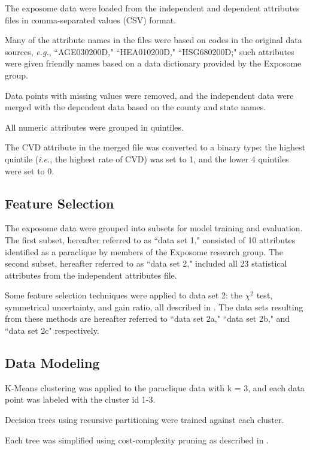 \documentclass[conference,compsoc]{IEEEtran}
\begin{document}
The exposome data were loaded from the independent and dependent attributes files in comma-separated values (CSV) format.

Many of the attribute names in the files were based on codes in the original data sources, \textit{e.g.}, ``AGE030200D," ``HEA010200D," ``HSG680200D;"
such attributes were given friendly names based on a data dictionary provided by the Exposome group.

Data points with missing values were removed, and the independent data were merged with the dependent data based on the county and state names.

All numeric attributes were grouped in quintiles.

The CVD attribute in the merged file was converted to a binary type: the highest quintile (\textit{i.e.}, the highest rate of CVD) was set to 1,
and the lower 4 quintiles were set to 0.

\subsection{Feature Selection}

The exposome data were grouped into subsets for model training and evaluation. The first subset, hereafter referred to as ``data set 1,"
consisted of 10 attributes identified as a paraclique by members of the Exposome research group. The second subset, hereafter referred to as ``data set 2,"
included all 23 statistical attributes from the independent attributes file.

Some feature selection techniques were applied to data set 2: the ${\chi}^2$ test, symmetrical uncertainty, and gain ratio, 
all described in \cite{fselector}. The data sets resulting
from these methods are hereafter referred to ``data set 2a," ``data set 2b," and ``data set 2c" respectively.

\subsection{Data Modeling}

K-Means clustering \cite{hartigan} was applied to the paraclique data with k = 3, and each data point was labeled with the cluster id 1-3.

Decision trees using recursive partitioning \cite{rpart} were trained against each cluster.

Each tree was simplified using cost-complexity pruning as described in \cite{quinlan}.
\end{document}
